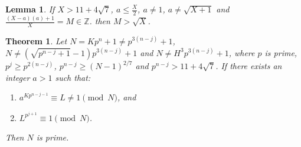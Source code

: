 \documentclass[10pt,a4paper]{amsart}
\newtheorem{theorem}{Theorem}
\newtheorem{lemma}{Lemma}
\begin{document}
\begin{lemma}\label{lem33}
	If $X > 11+4\sqrt{7}$, $a \le \frac{X}{2}$, $a \neq 1$, $a \neq \sqrt{X+1}$ and $\frac{(X-a)(a)+1}{X}=M \in \mathbb{Z}$. then $M > \sqrt{X}$.  
\end{lemma}

\begin{theorem}\label{thm34}
	Let $N=Kp^n+1 \neq p^{3(n-j)}+1$, $N \neq (\sqrt{p^{n-j}+1}-1)p^{3(n-j)}+1$ and $N \neq H^3p^{3(n-j)}+1$, where $p$ is prime, $p^j \ge p^{2(n-j)} $, $p^{n-j} \ge (N-1)^{2/7}$ and $p^{n-j} > 11+4\sqrt{7}$. If there exists an integer $a>1$ such that:
	\begin{enumerate}
		\item[(i)] $a^{Kp^{n-j-1}} \equiv L \neq 1 \pmod N$, and
		\item[(ii)] $L^{p^{j+1}} \equiv 1 \pmod N$.
	\end{enumerate}
	Then $N$ is prime.
\end{theorem}
\end{document}
